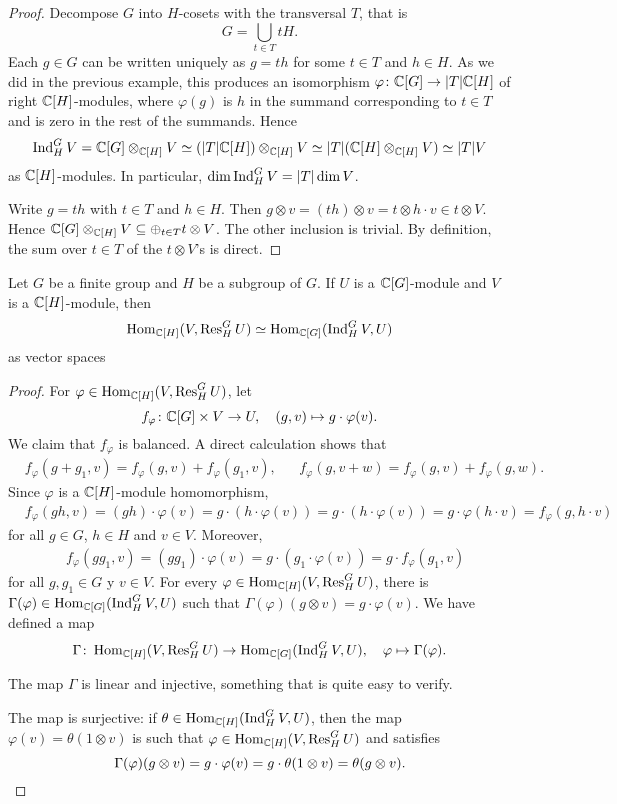 \begin{proof}
Decompose $G$ into $H$-cosets with the transversal 
$T$, that is 
\[
G=\bigcup_{t\in T}tH.
\]
Each $g\in G$ can be written uniquely as $g=th$ for some $t\in T$ and $h\in H$. As we did in the previous example, this 
produces an isomorphism 
$\varphi\colon \mathbb{C}[G]\to |T|\mathbb{C}[H]$ of right $\mathbb{C}[H]$-modules, where $\varphi(g)$ is $h$ in the summand corresponding to $t\in T$
and is zero in the rest of the summands. Hence 
\[
\operatorname{Ind}_H^GV=\mathbb{C}[G]\otimes_{\mathbb{C}[H]}V\simeq (|T|\mathbb{C}[H])\otimes_{\mathbb{C}[H]}V\simeq |T|(\mathbb{C}[H]\otimes_{\mathbb{C}[H]}V)\simeq |T|V
\]
as $\mathbb{C}[H]$-modules. In particular, $\dim\operatorname{Ind}_H^GV=|T|\dim V$. 

 Write $g=th$ with $t\in T$ and $h\in H$. Then $g\otimes v=(th)\otimes v=t\otimes h\cdot v\in t\otimes V$. 
Hence $\mathbb{C}[G]\otimes_{\mathbb{C}[H]}V\subseteq \oplus_{t\in T}t\otimes V$. The other inclusion is trivial. By definition, 
the sum over $t\in T$ of the $t\otimes V$'s is direct.
\end{proof}

\begin{theorem}
Let $G$ be a finite group and $H$ be a subgroup of $G$. 
If $U$ is a $\mathbb{C}[G]$-module and $V$ is a $\mathbb{C}[H]$-module, then
\[
\operatorname{Hom}_{\mathbb{C}[H]}(V,\operatorname{Res}_H^GU)\simeq \operatorname{Hom}_{\mathbb{C}[G]}(\operatorname{Ind}_H^GV,U)
\]
as vector spaces
\end{theorem}

\begin{proof}
For $\varphi\in\operatorname{Hom}_{\mathbb{C}[H]}(V,\operatorname{Res}_H^GU)$, let 
\[
f_{\varphi}\colon \mathbb{C}[G]\times V\to U,
\quad
(g,v)\mapsto g\cdot\varphi(v).
\]
We claim that $f_{\varphi}$ is balanced. A direct calculation shows that 
\begin{align*}
    &f_{\varphi}(g+g_1,v)=f_{\varphi}(g,v)+f_{\varphi}(g_1,v),&&
    f_{\varphi}(g,v+w)=f_{\varphi}(g,v)+f_{\varphi}(g,w).
\end{align*}
Since $\varphi$ is a $\mathbb{C}[H]$-module homomorphism,
\begin{align*}
    &f_{\varphi}(gh,v)=(gh)\cdot\varphi(v)
    =g\cdot (h\cdot \varphi(v))
    =g\cdot (h\cdot\varphi(v))
    =g\cdot \varphi(h\cdot v)=f_{\varphi}(g,h\cdot v)
\end{align*}
for all $g\in G$, $h\in H$ and $v\in V$. Moreover, 
\begin{align*}
    &f_{\varphi}(gg_1,v)=(gg_1)\cdot\varphi(v)=g\cdot(g_1\cdot\varphi(v))=g\cdot f_{\varphi}(g_1,v)
\end{align*}
for all $g,g_1\in G$ y $v\in V$. For every $\varphi\in\operatorname{Hom}_{\mathbb{C}[H]}(V,\operatorname{Res}_H^GU)$, there is 
$\Gamma(\varphi)\in\operatorname{Hom}_{\mathbb{C}[G]}(\operatorname{Ind}_H^GV,U)$ such that 
$\Gamma(\varphi)(g\otimes v)=g\cdot\varphi(v)$. 
We have defined a map  
\[
\Gamma\colon \operatorname{Hom}_{\mathbb{C}[H]}(V,\operatorname{Res}_H^GU)\to\operatorname{Hom}_{\mathbb{C}[G]}(\operatorname{Ind}_H^GV,U),
\quad
\varphi\mapsto\Gamma(\varphi).
\]

The map $\Gamma$ is linear and injective, something that is quite easy to verify. 

The map is surjective: if $\theta\in\operatorname{Hom}_{\mathbb{C}[H]}(\operatorname{Ind}_H^GV,U)$, then
the map $\varphi(v)=\theta(1\otimes v)$ is such that $\varphi\in\operatorname{Hom}_{\mathbb{C}[H]}(V,\operatorname{Res}_H^GU)$ and satisfies 
\[
\Gamma(\varphi)(g\otimes v)=g\cdot\varphi(v)=g\cdot\theta(1\otimes v)=\theta(g\otimes v).\qedhere
\]
\end{proof}

